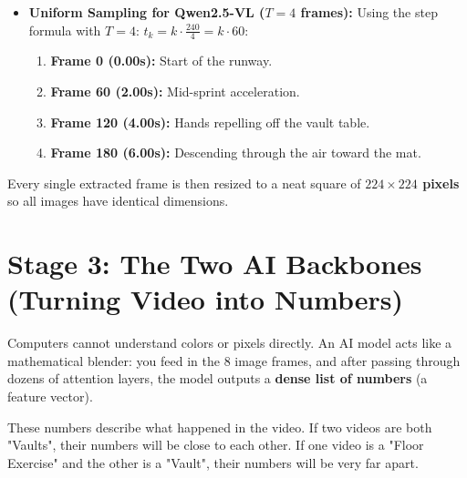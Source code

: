 \documentclass[a4paper, 11pt]{article}
\begin{document}
\begin{examplebox}
\begin{itemize}
    \item \textbf{Uniform Sampling for Qwen2.5-VL ($T=4$ frames):}
    Using the step formula with $T=4$: $t_k = k \cdot \frac{240}{4} = k \cdot 60$:
    \begin{enumerate}
        \item \textbf{Frame 0 (0.00s):} Start of the runway.
        \item \textbf{Frame 60 (2.00s):} Mid-sprint acceleration.
        \item \textbf{Frame 120 (4.00s):} Hands repelling off the vault table.
        \item \textbf{Frame 180 (6.00s):} Descending through the air toward the mat.
    \end{enumerate}
\end{itemize}
Every single extracted frame is then resized to a neat square of \textbf{$224 \times 224$ pixels} so all images have identical dimensions.
\end{examplebox}

\section{Stage 3: The Two AI Backbones (Turning Video into Numbers)}

\begin{conceptbox}
Computers cannot understand colors or pixels directly. An AI model acts like a mathematical blender: you feed in the 8 image frames, and after passing through dozens of attention layers, the model outputs a \textbf{dense list of numbers} (a feature vector). 

These numbers describe what happened in the video. If two videos are both "Vaults", their numbers will be close to each other. If one video is a "Floor Exercise" and the other is a "Vault", their numbers will be very far apart.
\end{conceptbox}
\end{document}
